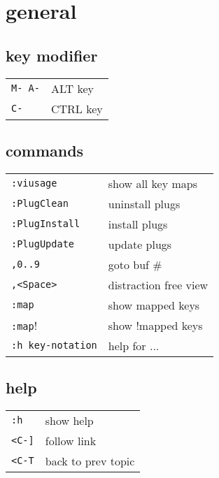 \section{\hrulefill general\hrulefill}

\subsection{key modifier}
\begin{tabular}{@{}ll@{}}
    \verb!M- A-!        & ALT key \\
    \verb!C-!           & CTRL key \\
\end{tabular}

\subsection{commands}
\begin{tabular}{@{}ll@{}}
    \verb!:viusage!         & show all key maps \\
    \verb!:PlugClean!       & uninstall plugs \\
    \verb!:PlugInstall!     & install plugs \\
    \verb!:PlugUpdate!      & update plugs \\
    \verb!,0..9!            & goto buf \# \\
    \verb!,<Space>!         & distraction free view \\
    \verb!:map!             & show mapped keys \\
    \verb!:map!!            & show !mapped keys \\
    \verb!:h key-notation!  & help for ... \\
\end{tabular}

\subsection{help}
\begin{tabular}{@{}ll@{}}
    \verb!:h!           & show help \\
    \verb!<C-]!         & follow link \\
    \verb!<C-T!         & back to prev topic \\
\end{tabular}

